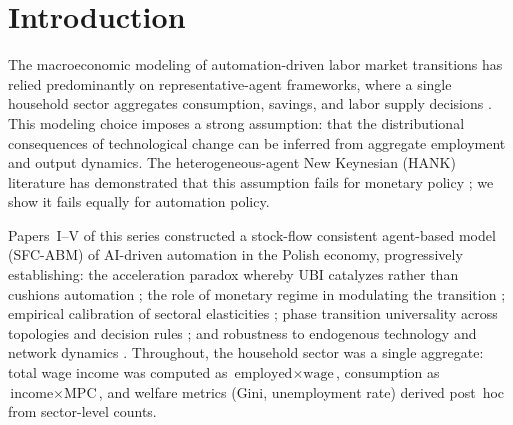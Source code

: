 \documentclass[12pt,a4paper]{article}
\begin{document}
\begin{abstract}
\medskip\noindent
\textbf{Keywords:} agent-based model, stock-flow consistency,
heterogeneous households, universal basic income, automation, unemployment
scarring, bankruptcy cascades, retraining policy, inequality

\medskip\noindent
\textbf{JEL codes:} C63, D31, E21, J24, O33

\medskip\noindent
\textbf{Code \& Data:}
\url{https://github.com/complexity-econ/paper-06-heterogeneous-households}

\end{abstract}

\newpage
\tableofcontents
\newpage

\section{Introduction}
\label{sec:intro}

The macroeconomic modeling of automation-driven labor market transitions
has relied predominantly on representative-agent frameworks, where a
single household sector aggregates consumption, savings, and labor supply
decisions \parencite{acemoglu2020, korinek2024}. This modeling choice
imposes a strong assumption: that the distributional consequences of
technological change can be inferred from aggregate employment and output
dynamics. The heterogeneous-agent New Keynesian (HANK) literature has
demonstrated that this assumption fails for monetary policy
\parencite{kaplan2018, krueger2016}; we show it fails equally for
automation policy.

Papers~I--V of this series constructed a stock-flow consistent
agent-based model (SFC-ABM) of AI-driven automation in the Polish
economy, progressively establishing: the acceleration paradox whereby
UBI catalyzes rather than cushions automation
\parencite{paperI}; the role of monetary regime in modulating
the transition \parencite{paperII}; empirical calibration of
sectoral elasticities \parencite{paperIII}; phase transition
universality across topologies and decision rules
\parencite{paperIV}; and robustness to endogenous technology and
network dynamics \parencite{paperV}. Throughout, the household
sector was a single aggregate: total wage income was computed as
$\text{employed} \times \text{wage}$, consumption as
$\text{income} \times \text{MPC}$, and welfare metrics (Gini,
unemployment rate) derived post~hoc from sector-level counts.
\end{document}
